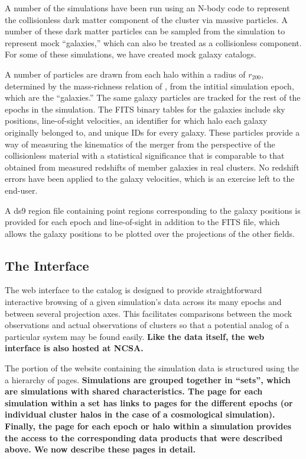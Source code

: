\documentclass{emulateapj}
\begin{document}
A number of the simulations have been run using an N-body code to represent the collisionless dark matter component of the cluster via massive particles. A number of these dark matter particles can be sampled from the simulation to represent mock ``galaxies,'' which can also be treated as a collisionless component. For some of these simulations, we have created mock galaxy catalogs.

A number of particles are drawn from each halo within a radius of $r_{200}$, determined by the mass-richness relation of \citet{for14}, from the intitial simulation epoch, which are the ``galaxies.'' The same galaxy particles are tracked for the rest of the epochs in the simulation. The FITS binary tables for the galaxies include sky positions, line-of-sight velocities, an identifier for which halo each galaxy originally belonged to, and unique IDs for every galaxy. These particles provide a way of measuring the kinematics of the merger from the perspective of the collisionless material with a statistical significance that is comparable to that obtained from measured redshifts of member galaxies in real clusters. No redshift errors have been applied to the galaxy velocities, which is an exercise left to the end-user.

A ds9 region file containing point regions corresponding to the galaxy positions is provided for each epoch and line-of-sight in addition to the FITS file, which allows the galaxy positions to be plotted over the projections of the other fields.

\subsection{The Interface}\label{sec:interface}

The web interface to the catalog is designed to provide straightforward interactive browsing of a given simulation's data across its many epochs and between several projection axes. This facilitates comparisons between the mock observations and actual observations of clusters so that a potential analog of a particular system may be found easily. \textbf{Like the data itself, the web interface is also hosted at NCSA.}

The portion of the website containing the simulation data is structured using the a hierarchy of pages. {\bf Simulations are grouped together in ``sets'', which are simulations with shared characteristics. The page for each simulation within a set has links to pages for the different epochs (or individual cluster halos in the case of a cosmological simulation). Finally, the page for each epoch or halo within a simulation provides the access to the corresponding data products that were described above. We now describe these pages in detail.}
\end{document}
